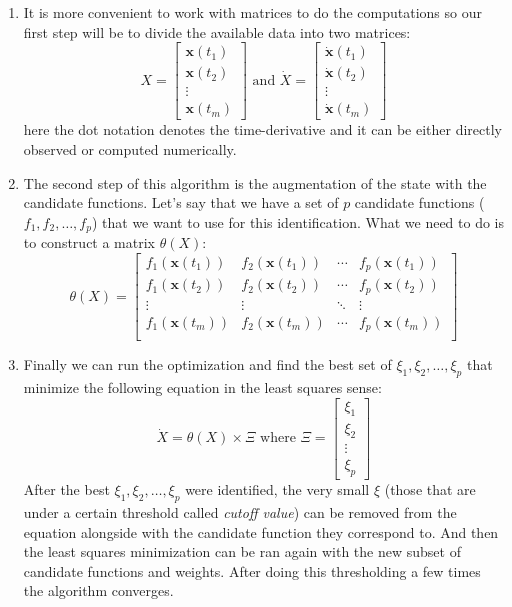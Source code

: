 \documentclass[12pt, letterpaper]{article}
\begin{document}
\begin{enumerate}
	\item It is more convenient to work with matrices to do the computations so our first step will be to divide the available data into two matrices:
	$$X = 
	\begin{bmatrix}
	\mathbf{x}(t_1) \\
	\mathbf{x}(t_2) \\
	\vdots \\
	\mathbf{x}(t_m)
	\end{bmatrix}
	\text{ and }
	\dot{X} =
	\begin{bmatrix}
	\dot{\mathbf{x}}(t_1) \\
	\dot{\mathbf{x}}(t_2) \\
	\vdots \\
	\dot{\mathbf{x}}(t_m)
	\end{bmatrix}
	$$
	here the dot notation denotes the time-derivative and it can be either directly observed or computed numerically.

	\item The second step of this algorithm is the augmentation of the state with the candidate functions. 
	Let's say that we have a set of $p$ candidate functions ($f_1, f_2, \dots, f_p$) that we want to use for this identification. 
	What we need to do is to construct a matrix $\theta(X)$:
	$$\theta(X) = 
	\begin{bmatrix}
	f_1(\mathbf{x}(t_1)) & f_2(\mathbf{x}(t_1)) & \cdots & f_p(\mathbf{x}(t_1))\\
	f_1(\mathbf{x}(t_2)) & f_2(\mathbf{x}(t_2)) & \cdots & f_p(\mathbf{x}(t_2))\\
	\vdots & \vdots  & \ddots & \vdots\\
	f_1(\mathbf{x}(t_m)) & f_2(\mathbf{x}(t_m)) & \cdots & f_p(\mathbf{x}(t_m))\\
	\end{bmatrix}
	$$

	\item Finally we can run the optimization and find the best set of $\xi_1, \xi_2, \dots, \xi_p$ that minimize the following equation in the least squares sense:
	$$\dot{X} = \theta(X) \times \Xi \text{ where } \Xi = 
	\begin{bmatrix}
	\xi_1 \\
	\xi_2 \\
	\vdots \\
	\xi_p
	\end{bmatrix}
	$$
	After the best $\xi_1, \xi_2, \dots, \xi_p$ were identified, the very small $\xi$ (those that are under a certain threshold called {\em cutoff value}) can be removed from the equation alongside with the candidate function they correspond to. 
	And then the least squares minimization can be ran again with the new subset of candidate functions and weights. 
	After doing this thresholding a few times the algorithm converges.

\end{enumerate}
\end{document}
